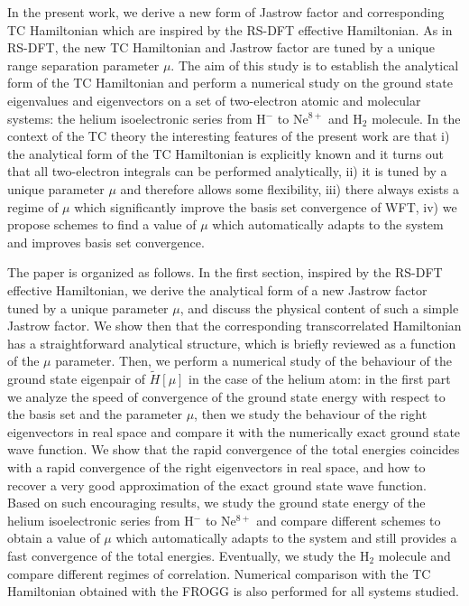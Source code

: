 \documentclass[aip,jcp,reprint,noshowkeys,superscriptaddress]{revtex4-1}
\begin{document}
In the present work, we derive a new form of Jastrow factor and corresponding TC Hamiltonian which are inspired by the RS-DFT effective Hamiltonian. As in RS-DFT, the new TC Hamiltonian and Jastrow factor are tuned by a unique range separation parameter $\mu$. The aim of this study is to establish the analytical form of the TC Hamiltonian and perform a numerical study on the ground state eigenvalues and eigenvectors on a set of two-electron atomic and molecular systems: the helium isoelectronic series from H$^-$ to Ne$^{8+}$ and H$_2$ molecule. In the context of the TC theory the interesting features of the present work are that i) the analytical form of the TC Hamiltonian is explicitly known and it turns out that all two-electron integrals can be performed analytically, ii) it is tuned by a unique parameter $\mu$ and therefore allows some flexibility, iii) there always exists a regime of $\mu$ which significantly improve the basis set convergence of WFT, iv) we propose schemes to find a value of $\mu$ which automatically adapts to the system and improves basis set convergence. 

The paper is organized as follows. 
In the first section, inspired by the RS-DFT effective Hamiltonian,  
we derive the analytical form of a new Jastrow factor tuned by a unique parameter $\mu$, and discuss the physical content of such a simple Jastrow factor. 
We show then that the corresponding transcorrelated Hamiltonian has a straightforward analytical structure, which is briefly reviewed as a function of the $\mu$ parameter. 
Then, we perform a numerical study of the behaviour of the ground state eigenpair of $\tilde{H}[\mu]$ in the case of the helium atom: 
in the first part we analyze the speed of convergence of the ground state energy with respect to the basis set and the parameter $\mu$, 
then we study the behaviour of the right eigenvectors in real space and compare it with the numerically exact ground state wave function. 
We show that the rapid convergence of the total energies coincides with a rapid convergence of the right eigenvectors in real space, and how to recover a very good approximation of the exact ground state wave function. 
Based on such encouraging results, we study the ground state energy of the helium isoelectronic series from H$^-$ to Ne$^{8+}$ and compare different schemes to obtain 
a value of $\mu$ which automatically adapts to the system and still provides a fast convergence of the total energies. 
Eventually, we study the H$_2$ molecule and compare different regimes of correlation. 
Numerical comparison with the TC Hamiltonian obtained with the FROGG is also performed for all systems studied.  
\end{document}
